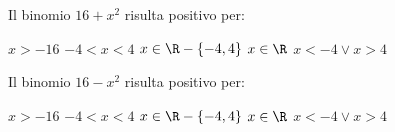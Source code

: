 \begin{esercizio}
\label{ese:4.24}
Il binomio \(16+x^2\) risulta positivo per:

\boxA\; \(x>-16\)\quad \boxB\; \(-4<x<4\) \quad\boxC\; \(x\in 
\R-\{-4,4\}\) 
\quad\boxD\; \(x\in \R\) \quad\boxE\; \(x<-4\vee x>4\)
\end{esercizio}

\begin{esercizio}
\label{ese:4.25}
Il binomio \(16-x^2\) risulta positivo per:

\boxA\; \(x>-16\)\quad \boxB\; \(-4<x<4\) \quad\boxC\; \(x\in 
\R-\{-4,4\}\) 
\quad\boxD\; \(x\in \R\) \quad\boxE\; \(x<-4\vee x>4\)
\end{esercizio}


